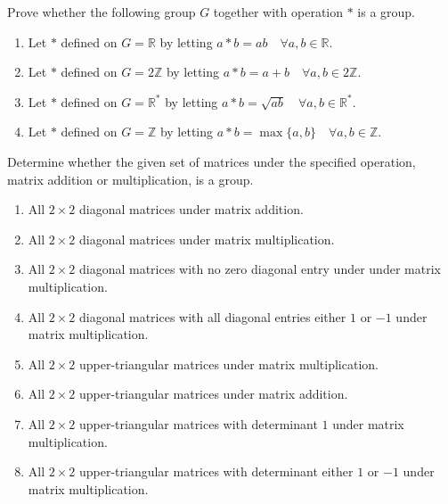 \begin{mdframed}
    \vspace{-0.25cm}
    \hspace{-0.25cm}
    \begin{Exercise}
        Prove whether the following group $G$ together with operation $*$ is a group.
        \begin{enumerate}
            \item Let $*$ defined on $G = \mathbb{R}$ by letting $a * b = ab \quad \forall a, b \in \mathbb{R}$.
            \item Let $*$ defined on $G = 2\mathbb{Z}$ by letting $a * b = a + b \quad \forall a, b \in 2\mathbb{Z}$.
            \item Let $*$ defined on $G = \mathbb{R}^*$ by letting $a * b = \sqrt{ab} \quad \forall a, b \in \mathbb{R}^*$.
            \item Let $*$ defined on $G = \mathbb{Z}$ by letting $a * b = \max \{a,b\} \quad \forall a, b \in \mathbb{Z}$.
        \end{enumerate}
    \end{Exercise}

    \vspace{0.752cm}
    \begin{Exercise}
        Determine whether the given set of matrices under the specified operation, matrix addition or multiplication, is a group.
        \begin{enumerate}
            \item All $2 \times 2$ diagonal matrices under matrix addition.
            \item All $2 \times 2$ diagonal matrices under matrix multiplication.
            \item All $2 \times 2$ diagonal matrices with no zero diagonal entry under under matrix multiplication.
            \item All $2 \times 2$ diagonal matrices with all diagonal entries either $1$ or $-1$ under matrix multiplication.
            \item All $2 \times 2$ upper-triangular matrices under matrix multiplication.
            \item All $2 \times 2$ upper-triangular matrices under matrix addition.
            \item All $2 \times 2$ upper-triangular matrices with determinant $1$ under matrix multiplication.
            \item All $2 \times 2$ upper-triangular matrices with determinant either $1$ or $-1$ under matrix multiplication.
        \end{enumerate}
    \end{Exercise}


\end{mdframed}
